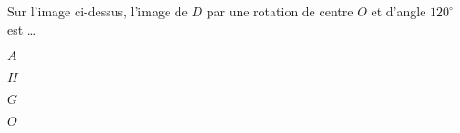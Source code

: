 \begin{QCM}
\begin{GroupeQCM}
    
    \begin{exercice}
      Sur l'image ci-dessus, l'image de $D$ par une rotation de centre $O$ et d'angle $120^\circ$ est \ldots
      \begin{ChoixQCM}{4}
      \item $A$
      \item $H$
      \item $G$
      \item $O$
      \end{ChoixQCM}
\begin{corrige}
   \end{corrige}
    \end{exercice}


\end{GroupeQCM}
\end{QCM}

  